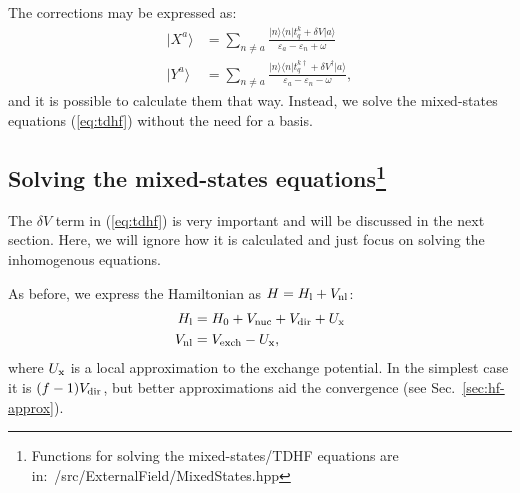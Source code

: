 \documentclass[10pt,twocolumn,a4paper]{article}%
\newcommand{\bra}[1]{\ensuremath{\langle #1|}}	%
\newcommand{\ket}[1]{\ensuremath{|#1\rangle}}
\def\en{\ensuremath{\varepsilon}}
\renewcommand{\a}{\ensuremath{\alpha}}
\begin{document}
The corrections may be expressed as:
\begin{equation}\begin{split}\label{eq:XiEtaSum}
\ket{X^a} &= \sum_{n\neq a}\frac{\ket{n}\bra{n}{t^k_q+\delta V}\ket{a}}{\en_a-\en_n+\omega}
\\
\ket{Y^a} &= \sum_{n\neq a}\frac{\ket{n}\bra{n}{t^{k\dag}_q+\delta V^\dag}\ket{a}}{\en_a-\en_n-\omega},
\end{split}\end{equation}
and it is possible to calculate them that way.
Instead, we solve the mixed-states equations (\ref{eq:tdhf}) without the need for a basis.



\subsection[Solving the TDHF equations]{Solving the mixed-states equations\label{sec:tdhf-solve}\footnote{Functions for solving the mixed-states/TDHF equations are in:~/src/ExternalField/MixedStates.hpp}}

The $\delta V$ term in (\ref{eq:tdhf}) is very important and will be discussed in the next section. 
Here, we will ignore how it is calculated and just focus on solving the inhomogenous equations. 


As before, we express the Hamiltonian as $H =H_{\rm l} + V_{\rm nl} $: %
\begin{align}
H_{\rm l}&= H_0 + V_{\rm nuc} +  V_{\rm dir} +  U_{\rm x} \\
V_{\rm nl} &= V_{\rm exch} - U_{\rm x},
\end{align}
where $U_{\rm x}$ is a local approximation to the exchange potential.
In the simplest case it is $(f-1)V_{\rm dir}$, but better approximations aid the convergence (see Sec.~\ref{sec:hf-approx}).
\end{document}
